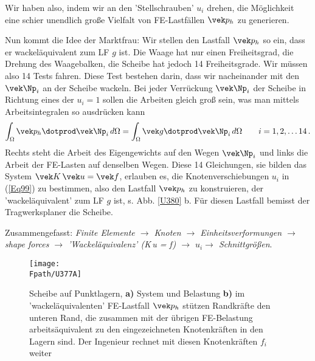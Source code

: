 {Wir haben also, indem wir an den 'Stellschrauben' $u_i$ drehen, die M\"{o}glichkeit eine schier unendlich gro{\ss}e Vielfalt von FE-Lastf\"{a}llen $\vek p_h$ zu generieren.

Nun kommt die Idee der Marktfrau: Wir stellen den Lastfall $\vek p_h$ so ein, dass er wackel\"{a}quivalent zum LF $g$ ist. Die Waage hat nur einen Freiheitsgrad, die Drehung des Waagebalken, die Scheibe hat jedoch 14 Freiheitsgrade. Wir m\"{u}ssen also 14 Tests fahren. Diese Test bestehen darin, dass wir nacheinander mit den $\vek \Np_i$ an der Scheibe wackeln. Bei jeder Verr\"{u}ckung $\vek \Np_i$ der Scheibe in Richtung eines der $u_i = 1$ sollen die Arbeiten gleich gro{\ss} sein, was man mittels Arbeitsintegralen so ausdr\"{u}cken kann
\begin{align}
 \int_{\Omega} \vek p_h \dotprod  \vek \Np_i \,d\Omega = \int_{\Omega} \vek g \dotprod \vek \Np_i \,d\Omega \qquad i = 1, 2, \ldots 14\,.
\end{align}
Rechts steht die Arbeit des Eigengewichts auf den Wegen $\vek \Np_i$ und links die Arbeit der FE-Lasten auf denselben Wegen. Diese 14 Gleichungen, sie bilden das System $\vek K\,\vek u = \vek f$, erlauben es, die Knotenverschiebungen $u_i$ in (\ref{Eq99}) zu bestimmen, also den Lastfall $\vek p_h$ zu konstruieren, der 'wackel\"{a}quivalent' zum LF $g$ ist, s. Abb. \ref{U380} b. F\"{u}r diesen Lastfall bemisst der Tragwerksplaner die Scheibe.

Zusammengefasst: {\em Finite Elemente $ \rightarrow$ Knoten $ \rightarrow$ Einheitsverformungen $ \rightarrow$ shape forces $ \rightarrow$ 'Wackel\"{a}quivalenz' (\vek K\,\vek u = \vek f) $ \rightarrow$ $u_i$$ \rightarrow$ Schnittgr\"{o}{\ss}en\/}.

\begin{figure}[tbp]
\centering
\texttt{[image: \\Fpath/U377A]}
\caption{Scheibe auf Punktlagern, \textbf{a)} System und Belastung \textbf{b)} im 'wackel\"{a}quivalenten' FE-Lastfall $\vek p_h$ st\"{u}tzen Randkr\"{a}fte den unteren Rand, die zusammen mit der \"{u}brigen FE-Belastung arbeits\"{a}quivalent zu den eingezeichneten Knotenkr\"{a}ften in den Lagern sind. Der Ingenieur rechnet mit diesen Knotenkr\"{a}ften $f_i$ weiter} \label{U377}
\end{figure}%

}
